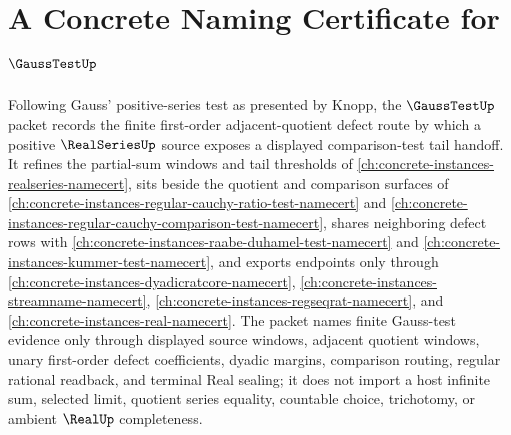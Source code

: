 \chapter{A Concrete Naming Certificate for $\GaussTestUp$}
\label{ch:concrete-instances-gauss-test-namecert}

Following Gauss' positive-series test as presented by Knopp, the $\GaussTestUp$ packet records the finite first-order adjacent-quotient defect route by which a positive $\RealSeriesUp$ source exposes a displayed comparison-test tail handoff. It refines the partial-sum windows and tail thresholds of \autoref{ch:concrete-instances-realseries-namecert}, sits beside the quotient and comparison surfaces of \autoref{ch:concrete-instances-regular-cauchy-ratio-test-namecert} and \autoref{ch:concrete-instances-regular-cauchy-comparison-test-namecert}, shares neighboring defect rows with \autoref{ch:concrete-instances-raabe-duhamel-test-namecert} and \autoref{ch:concrete-instances-kummer-test-namecert}, and exports endpoints only through \autoref{ch:concrete-instances-dyadicratcore-namecert}, \autoref{ch:concrete-instances-streamname-namecert}, \autoref{ch:concrete-instances-regseqrat-namecert}, and \autoref{ch:concrete-instances-real-namecert}. The packet names finite Gauss-test evidence only through displayed source windows, adjacent quotient windows, unary first-order defect coefficients, dyadic margins, comparison routing, regular rational readback, and terminal Real sealing; it does not import a host infinite sum, selected limit, quotient series equality, countable choice, trichotomy, or ambient $\RealUp$ completeness.

